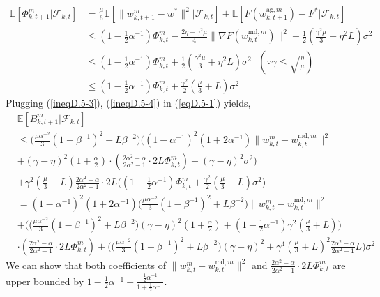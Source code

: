\documentclass[11pt]{article}
\begin{document}
\begin{align} \label{ineqD.5-4}
    \mathbb{E}[\Phi_{k, t+1}^m|\mathcal{F}_{k, t}] &= \frac{\mu}{6}\mathbb{E}[\|w_{k, t+1}^m-w^*\|^2|\mathcal{F}_{k, t}] + \mathbb{E}[F(w_{k, t+1}^{\textrm{ag}, m}) - F^*|\mathcal{F}_{k, t}] \nonumber\\
    &\leq (1-\frac{1}{2}\alpha^{-1})\Phi_{k, t}^m - \frac{2\eta - \gamma^2\mu}{4}\|\nabla F(w_{k, t}^{\textrm{md}, m})\|^2 + \frac{1}{2}(\frac{\gamma^2\mu}{3}+\eta^2 L)\sigma^2 \nonumber\\
    &\leq (1-\frac{1}{2}\alpha^{-1})\Phi_{k, t}^m  + \frac{1}{2}(\frac{\gamma^2\mu}{3}+\eta^2 L)\sigma^2 \textrm{ }(\because \gamma \leq \sqrt{\frac{\eta}{\mu}}) \nonumber\\
    &\leq (1-\frac{1}{2}\alpha^{-1})\Phi_{k, t}^m  + \frac{\gamma^2}{2}(\frac{\mu}{3}+L)\sigma^2
\end{align}
Plugging (\ref{ineqD.5-3}), (\ref{ineqD.5-4}) in (\ref{eqD.5-1}) yields,
\begin{align} \label{ineqD.5-5}
    &\mathbb{E}[B_{k, t+1}^m|\mathcal{F}_{k, t}] \nonumber\\
    &\leq  \Big(\frac{\mu\alpha^{-2}}{3}(1-\beta^{-1})^2 + L\beta^{-2}\Big)\Big((1-\alpha^{-1})^2(1+2\alpha^{-1}) \|w_{k, t}^m - w_{k, t}^{\textrm{md}, m}\|^2 \nonumber\\
    &+ (\gamma-\eta)^2(1+\frac{\alpha}{2}) \cdot (\frac{2\alpha^2-\alpha}{2\alpha^2-1}\cdot 2L \Phi_{k, t}^m) + (\gamma-\eta)^2 \sigma^2 \Big) \nonumber\\
    &+ \gamma^2(\frac{\mu}{3} + L)\frac{2\alpha^2-\alpha}{2\alpha^2-1}\cdot 2L\Big((1-\frac{1}{2}\alpha^{-1})\Phi_{k, t}^m  + \frac{\gamma^2}{2}(\frac{\mu}{3}+L)\sigma^2\Big) \nonumber\\
    &= (1-\alpha^{-1})^2(1+2\alpha^{-1})\Big(\frac{\mu\alpha^{-2}}{3}(1-\beta^{-1})^2 + L\beta^{-2}\Big) \|w_{k, t}^m - w_{k, t}^{\textrm{md}, m}\|^2 \nonumber\\
    &+ \bigg(\Big(\frac{\mu\alpha^{-2}}{3}(1-\beta^{-1})^2 + L\beta^{-2}\Big)(\gamma-\eta)^2(1+\frac{\alpha}{2}) + (1-\frac{1}{2}\alpha^{-1})\gamma^2(\frac{\mu}{3}+L)\bigg) \nonumber\\
    &\cdot(\frac{2\alpha^2-\alpha}{2\alpha^2-1}\cdot 2L \Phi_{k, t}^m) + \bigg(\Big(\frac{\mu\alpha^{-2}}{3}(1-\beta^{-1})^2 + L\beta^{-2}\Big)(\gamma-\eta)^2+\gamma^4(\frac{\mu}{3}+L)^2\frac{2\alpha^2-\alpha}{2\alpha^2-1}L\bigg)\sigma^2
\end{align}
We can show that both coefficients of $\|w_{k, t}^m - w_{k, t}^{\textrm{md}, m}\|^2$ and $\frac{2\alpha^2-\alpha}{2\alpha^2-1}\cdot 2L \Phi_{k, t}^m$ are upper bounded by $1-\frac{1}{2}\alpha^{-1}+\frac{\frac{1}{2}\alpha^{-1}}{1+\frac{1}{2}\alpha^{-1}}$.
\end{document}
